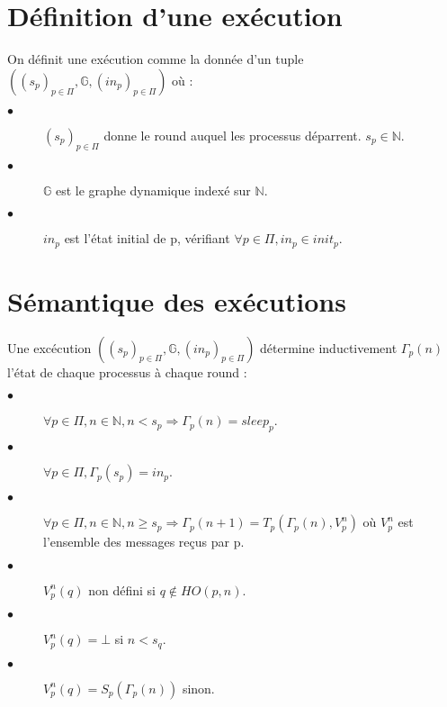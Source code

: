\documentclass{article}
\begin{document}
\section{Définition d'une exécution}

On définit une exécution comme la donnée d'un tuple
$((s_p)_{p \in \Pi}, \mathds{G}, (in_p)_{p \in \Pi})$ où :

\begin{description}

	\item[$\bullet$] $(s_p)_{p \in \Pi}$ donne le round auquel les processus déparrent.
		$s_p \in \mathds{N}$.
	\item[$\bullet$] $\mathds{G}$ est le graphe dynamique indexé sur $\mathds{N}$.
	\item[$\bullet$] $in_p$ est l'état initial de p, vérifiant $\forall p \in \Pi, in_p \in init_p$.

\end{description}

\section{Sémantique des exécutions}

Une excécution $((s_p)_{p \in \Pi}, \mathds{G}, (in_p)_{p \in \Pi})$ détermine inductivement
$\Gamma_p(n)$ l'état de chaque processus à chaque round :

\begin{description}

	\item[$\bullet$] $\forall p \in \Pi,  n \in \mathds{N},
		n < s_p \Rightarrow \Gamma_p(n) = sleep_p$.
	\item[$\bullet$] $\forall p \in \Pi, \Gamma_p(s_p) = in_p$.
	\item[$\bullet$] $\forall p \in \Pi,  n \in \mathds{N}, n \geq s_p \Rightarrow
		\Gamma_p(n+1) = T_p (\Gamma_p(n) ,V_p^n)$ où $V_p^n$ est l'ensemble des messages reçus par p.
	\item[$\bullet$] $V_p^n(q)$ non défini si $q \notin HO(p, n)$.
	\item[$\bullet$] $V_p^n(q) = \bot$ si $n < s_q$.
	\item[$\bullet$] $V_p^n(q) = S_p (\Gamma_p(n))$ sinon.

\end{description}
\end{document}
